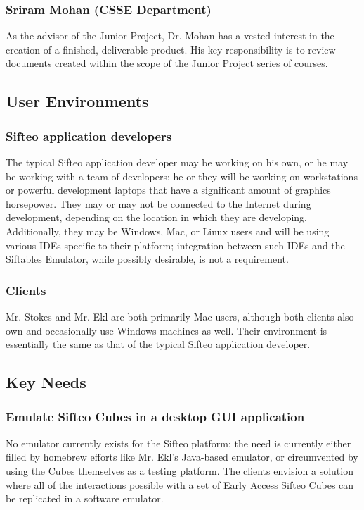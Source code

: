 \documentclass[12pt]{article}
\begin{document}
                          \subsubsection{Sriram Mohan (CSSE Department)}
                          As the advisor of the Junior Project, Dr. Mohan has a vested interest in the creation of a finished, deliverable product. His key responsibility is to review documents created within the scope of the Junior Project series of courses.

               \subsection{User Environments}

                          \subsubsection{Sifteo application developers}
                          The typical Sifteo application developer may be working on his own, or he may be working with a team of developers; he or they will be working on workstations or powerful development laptops that have a significant amount of graphics horsepower. They may or may not be connected to the Internet during development, depending on the location in which they are developing. Additionally, they may be \gls{Windows}, \gls{Mac}, or \gls{Linux} users and will be using various \glspl{IDE} specific to their platform; integration between such \glspl{IDE} and the Siftables Emulator, while possibly desirable, is not a requirement.

                          \subsubsection{Clients}
			  Mr. Stokes and Mr. Ekl are both primarily \gls{Mac} users, although both clients also own and occasionally use \gls{Windows} machines as well. Their environment is essentially the same as that of the typical Sifteo application developer.

               \subsection{Key Needs}

                          \subsubsection{Emulate Sifteo Cubes in a desktop GUI application}
                          No emulator currently exists for the Sifteo platform; the need is currently either filled by homebrew efforts like Mr. Ekl's Java-based emulator, or circumvented by using the Cubes themselves as a testing platform. The clients envision a solution where all of the interactions possible with a set of Early Access Sifteo Cubes can be replicated in a software emulator.
\end{document}
